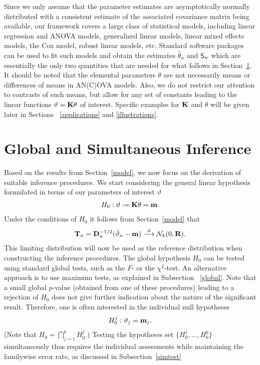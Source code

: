 \documentclass[12pt,a4paper]{article}
\begin{document}
Since we only assume that the parameter estimates are
asymptotically normally distributed with a consistent estimate of the
associated covariance matrix being available, our framework covers a large
class of statistical models, including linear regression and ANOVA models,
generalized linear models, linear mixed effects models, the Cox model,
robust linear models, etc. Standard software packages can be used to fit
such models and obtain the estimates $\hat{\theta}_n$ and $\textsf{S}_n$
which are essentially the only two quantities that are needed for what
follows in Section~\ref{siminf}. 
It should be noted that the elemental parameters $\theta$ are not
necessarily means or differences of means in AN(C)OVA models. Also, we do
not restrict our attention to contrasts of such means, but allow for any set
of constants leading to the linear functions $\vartheta = \mathbf{K}\theta $ of interest.
Specific examples for $\mathbf{K}$ and $\theta $ will be given later in Sections~%
\ref{applications} and \ref{illustrations}.

\section{Global and Simultaneous Inference}

\label{siminf}

Based on the results from Section~\ref{model}, we now focus on the
derivation of suitable inference procedures. We start considering the
general linear hypothesis \citep{Searle1971} formulated in terms
of our parameters of interest $\vartheta$
\begin{eqnarray*}
H_0: \vartheta := \mathbf{K} \theta = \mathbf{m}.
\end{eqnarray*}
Under the conditions of $H_0$ it follows from Section~\ref{model} that 
\begin{eqnarray*}
\mathbf{T}_n = \mathbf{D}_n^{-1/2} (\hat{\vartheta}_n - \mathbf{m}) \stackrel{d}{\longrightarrow} \mathcal{N}_k(0, \mathbf{R}). 
\end{eqnarray*}
This
limiting distribution will now be used as the reference distribution when
constructing the inference procedures. The global hypothesis $H_0$ can be
tested using standard global tests, such as the $F$- or the $\chi^2$-test.
An alternative approach is to use maximum tests, as explained in Subsection~%
\ref{global}. Note that a small global $p$-value (obtained from one of these
procedures) leading to a rejection of $H_0$ 
does not give further indication about the nature of the significant
result. Therefore, one is often interested in the individual null hypotheses 
\begin{eqnarray*}
H_0^j: \vartheta_j = \mathbf{m}_j.
\end{eqnarray*}
(Note that $H_0 = \bigcap_{j = 1}^k H_0^j$.) Testing the hypotheses set $%
\{H_0^1, \ldots, H_0^k\}$ simultaneously thus requires the individual
assessments while maintaining the familywise error rate, as discussed in
Subsection~\ref{simtest}
\end{document}
